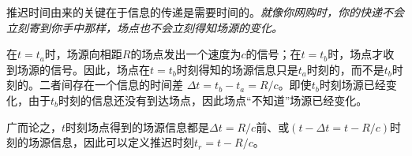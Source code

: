 推迟时间由来的关键在于信息的传递是需要时间的。\textsl{就像你网购时，你的快递不会立刻寄到你手中那样，场点也不会立刻得知场源的变化。}

在$t=t_a$时，场源向相距$R$的场点发出一个速度为$c$的信号；在$t=t_b$时，场点才收到场源的信号。因此，场点在$t=t_b$时刻得知的场源信息只是$t_a$时刻的，而不是$t_b$时刻的。二者间存在一个信息的时间差 $\Delta t= t_b-t_a = R/c $。即使$t_b$时刻场源已经变化，由于$t_b$时刻的信息还没有到达场点，因此场点“不知道”场源已经变化。

广而论之，$t$时刻场点得到的场源信息都是$\Delta t = R/c$前、或$(t-\Delta t = t-R/c)$时刻的场源信息，因此可以定义推迟时刻$t_r=t-R/c$。
